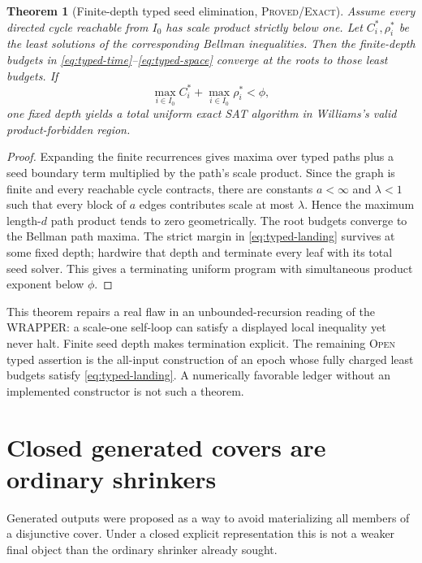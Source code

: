 \documentclass[11pt]{article}
\newtheorem{theorem}{Theorem}[section]
\newcommand{\Exact}{\textsc{Proved/Exact}}
\newcommand{\Open}{\textsc{Open}}
\begin{document}
\begin{theorem}[Finite-depth typed seed elimination, \Exact{}]
\label{thm:typed}
Assume every directed cycle reachable from $I_0$ has scale product strictly
below one.  Let $C_i^*,\rho_i^*$ be the least solutions of the corresponding
Bellman inequalities.  Then the finite-depth budgets in
\eqref{eq:typed-time}--\eqref{eq:typed-space} converge at the roots to those
least budgets.  If
\begin{equation}
 \max_{i\in I_0}C_i^*+\max_{i\in I_0}\rho_i^*<\phi,
 \label{eq:typed-landing}
\end{equation}
one fixed depth yields a total uniform exact SAT algorithm in Williams's
valid product-forbidden region.
\end{theorem}

\begin{proof}
Expanding the finite recurrences gives maxima over typed paths plus a seed
boundary term multiplied by the path's scale product.  Since the graph is
finite and every reachable cycle contracts, there are constants
$a<\infty$ and $\lambda<1$ such that every block of $a$ edges contributes
scale at most $\lambda$.  Hence the maximum length-$d$ path product tends to
zero geometrically.  The root budgets converge to the Bellman path maxima.
The strict margin in \eqref{eq:typed-landing} survives at some fixed depth;
hardwire that depth and terminate every leaf with its total seed solver.
This gives a terminating uniform program with simultaneous product exponent
below $\phi$.
\end{proof}

This theorem repairs a real flaw in an unbounded-recursion reading of the
WRAPPER: a scale-one self-loop can satisfy a displayed local inequality yet
never halt.  Finite seed depth makes termination explicit.  The remaining
\Open{} typed assertion is the all-input construction of an epoch whose
fully charged least budgets satisfy \eqref{eq:typed-landing}.  A numerically
favorable ledger without an implemented constructor is not such a theorem.

\section{Closed generated covers are ordinary shrinkers}

Generated outputs were proposed as a way to avoid materializing all members
of a disjunctive cover.  Under a closed explicit representation this is not a
weaker final object than the ordinary shrinker already sought.
\end{document}
